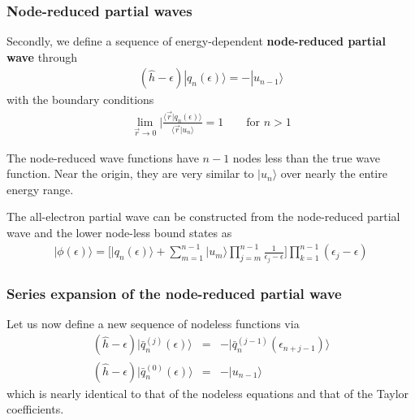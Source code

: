 \documentclass[11pt,a4paper]{report}
\begin{document}
\subsubsection{Node-reduced partial waves}
Secondly, we define a sequence of energy-dependent 
\textbf{node-reduced partial wave}
through
\begin{eqnarray}
(\hat{h}-\epsilon)|q_n(\epsilon)\rangle=-|u_{n-1}\rangle
\end{eqnarray}
with the boundary conditions
\begin{eqnarray}
\lim_{\vec{r}\rightarrow0}|
\frac{\langle\vec{r}|q_n(\epsilon)\rangle}
{\langle\vec{r}|u_n\rangle}=1
\qquad\text{for $n>1$}
\end{eqnarray}

The node-reduced wave functions have $n-1$ nodes less than the true
wave function. Near the origin, they are very similar to $|u_n\rangle$
over nearly the entire energy range.


The all-electron partial wave can be constructed from the node-reduced
partial wave and the lower node-less bound states
as\cite{bloechl12_arxiv1210_5937}
\begin{eqnarray}
|\phi(\epsilon)\rangle=\biggl[|q_n(\epsilon)\rangle
+\sum_{m=1}^{n-1}|u_m\rangle\prod_{j=m}^{n-1}\frac{1}{\epsilon_j-\epsilon}
\biggr]
\prod_{k=1}^{n-1}(\epsilon_j-\epsilon)
\label{eq:aephifromnodereduced}
\end{eqnarray}


\subsubsection{Series expansion of the node-reduced partial wave}





Let us now define a new sequence of nodeless functions via
\begin{eqnarray}
(\hat{h}-\epsilon)|\bar{q}_{n}^{(j)}(\epsilon)\rangle&=&
-|\bar{q}_n^{(j-1)}(\epsilon_{n+j-1})\rangle
\label{eq:qbardiffgl}
\\
(\hat{h}-\epsilon)|\bar{q}_{n}^{(0)}(\epsilon)\rangle&=&-|u_{n-1}\rangle
\end{eqnarray}
which is nearly identical to that of the nodeless equations and that
of the Taylor coefficients.
\end{document}
